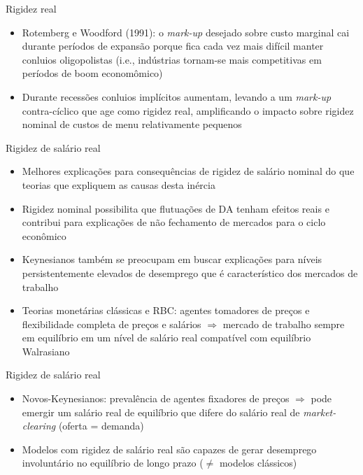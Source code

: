 \documentclass[10pt]{beamer}
\begin{document}
\begin{frame}{Rigidez real}
    \begin{itemize}
        \item Rotemberg e Woodford (1991): o \emph{mark-up} desejado sobre custo marginal cai durante períodos de expansão porque fica cada vez mais difícil manter conluios oligopolistas (i.e., indústrias tornam-se mais competitivas em períodos de boom economômico)\bigskip
        \item Durante recessões conluios implícitos aumentam, levando a um \emph{mark-up} contra-cíclico que age como rigidez real, amplificando o impacto sobre rigidez nominal de custos de menu relativamente pequenos
    \end{itemize}
\end{frame}

\begin{frame}{Rigidez de salário real}
    \begin{itemize}
        \item Melhores explicações para consequências de rigidez de salário nominal do que teorias que expliquem as causas desta inércia\bigskip
        \item Rigidez nominal possibilita que flutuações de DA tenham efeitos reais e contribui para explicações de não fechamento de mercados para o ciclo econômico\bigskip
        \item Keynesianos também se preocupam em buscar explicações para níveis persistentemente elevados de desemprego que é característico dos mercados de trabalho\bigskip
        \item Teorias monetárias clássicas e RBC: agentes tomadores de preços e flexibilidade completa de preços e salários $\Rightarrow$ mercado de trabalho sempre em equilíbrio em um nível de salário real compatível com equilíbrio Walrasiano
    \end{itemize}
\end{frame}

\begin{frame}{Rigidez de salário real}
    \begin{itemize}
        \item Novos-Keynesianos: prevalência de agentes fixadores de preços $\Rightarrow$ pode emergir um salário real de equilíbrio que difere do salário real de \emph{market-clearing} (oferta = demanda)\bigskip
        \item Modelos com rigidez de salário real são capazes de gerar desemprego involuntário no equilíbrio de longo prazo ($\neq$ modelos clássicos)\bigskip
    \end{itemize}
\end{frame}
\end{document}
